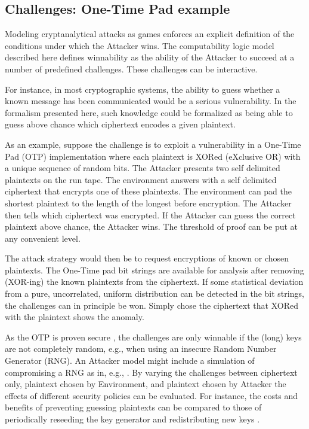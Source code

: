\documentclass{article}
\begin{document}
\subsection{Challenges: One-Time Pad example}\label{OTPchallenges}

Modeling cryptanalytical attacks as games enforces an explicit definition of
the conditions under which the Attacker wins. The computability logic model
described here defines winnability as the ability of the Attacker to succeed at
a number of predefined challenges. These challenges can be interactive.

For instance,
in most cryptographic systems, the ability to guess whether a known message
has been communicated would be a serious vulnerability. In the formalism
presented here, such knowledge could be formalized as being able to guess
above chance which ciphertext encodes a given plaintext.

As an example, suppose the challenge is to exploit a vulnerability in a One-Time
Pad (OTP) implementation where each plaintext is XORed (eXclusive OR) with a
unique sequence of random bits. The Attacker presents two self delimited
plaintexts on the run tape. The environment answers with a self delimited 
ciphertext that encrypts one of these plaintexts. The environment can pad the
shortest plaintext to the length of the
longest before encryption. The Attacker then tells which ciphertext was encrypted. 
If the Attacker can guess the correct plaintext above chance, the
Attacker wins. The threshold of proof can be put at any convenient level.

The attack strategy would then be to request encryptions of known or chosen
plaintexts. The One-Time pad bit strings are available for analysis after
removing (XOR-ing) the known plaintexts from the ciphertext. If some statistical
deviation from a pure, uncorrelated, uniform distribution can be detected in the bit strings,
the challenges can in principle be won. Simply chose the ciphertext that XORed
with the plaintext shows the anomaly.

As the OTP is proven secure \cite{Shannon1949}, the challenges are only winnable
if the (long) keys are not completely random, e.g., when using an insecure
Random Number Generator (RNG). An Attacker model might include a simulation
of compromising a
RNG as in, e.g., \cite{Gutterman1130388,kelsey98cryptanalytic}.
By varying the challenges between
ciphertext only, plaintext chosen by Environment, and plaintext chosen by Attacker
the effects of different security policies can be evaluated. For instance, the costs
and benefits of preventing guessing plaintexts can be compared to those of periodically
reseeding the key generator and redistributing new keys \cite{kelsey98cryptanalytic}.
\end{document}
